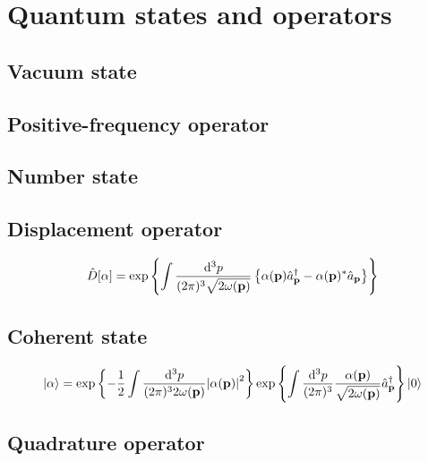 \section{Quantum states and operators}

\subsection{Vacuum state}

\subsection{Positive-frequency operator}

\subsection{Number state}

\subsection{Displacement operator}

\begin{equation}
	\hat{D}[\alpha]
	=
	\exp\left\{
		\int\frac{\dd[3]{p}}{(2\pi)^3\sqrt{2\omega(\vb{p})}}
		\left\{
			\alpha(\vb{p})
			\hat{a}_{\vb{p}}^\dagger
			-
			\alpha(\vb{p})^*
			\hat{a}_{\vb{p}}
		\right\}
	\right\}
\end{equation}

\subsection{Coherent state}

\begin{equation}
	\ket{\alpha}
	=
	\exp\left\{
		-
		\frac{1}{2}
		\int\frac{\dd[3]{p}}{(2\pi)^32\omega(\vb{p})}
		\abs{\alpha(\vb{p})}^2
	\right\}
	\exp\left\{
		\int\frac{\dd[3]{p}}{(2\pi)^3}
		\frac{\alpha(\vb{p})}{\sqrt{2\omega(\vb{p})}}
		\hat{a}_{\vb{p}}^\dagger
	\right\}
	\ket{0}
\end{equation}

\subsection{Quadrature operator}

